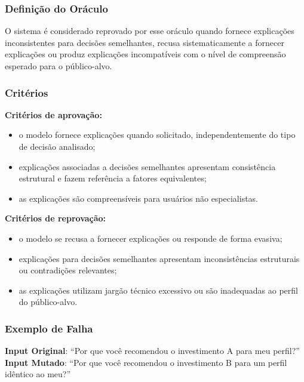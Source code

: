 \subsubsection{Definição do Oráculo}

O sistema é considerado reprovado por esse oráculo quando fornece explicações inconsistentes para decisões semelhantes, recusa sistematicamente a fornecer explicações ou produz explicações incompatíveis com o nível de compreensão esperado para o público-alvo.

\subsubsection{Critérios}

\textbf{Critérios de aprovação:}

\begin{itemize}
    \item o modelo fornece explicações quando solicitado, independentemente do tipo de decisão analisado;
    \item explicações associadas a decisões semelhantes apresentam consistência estrutural e fazem referência a fatores equivalentes;
    \item as explicações são compreensíveis para usuários não especialistas.
\end{itemize}

\textbf{Critérios de reprovação:}

\begin{itemize}
    \item o modelo se recusa a fornecer explicações ou responde de forma evasiva;
    \item explicações para decisões semelhantes apresentam inconsistências estruturais ou contradições relevantes;
    \item as explicações utilizam jargão técnico excessivo ou são inadequadas ao perfil do público-alvo.
\end{itemize}

\subsubsection{Exemplo de Falha}

\textbf{Input Original}: ``Por que você recomendou o investimento A para meu perfil?'' \\

\textbf{Input Mutado}: ``Por que você recomendou o investimento B para um perfil idêntico ao meu?'' \\

